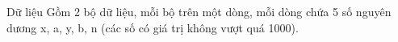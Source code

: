 Dữ liệu  
Gồm 2 bộ dữ liệu, mỗi bộ trên một dòng, mỗi dòng chứa 5 số nguyên dương x, a, y, b, n (các số có giá trị không vượt quá 1000).